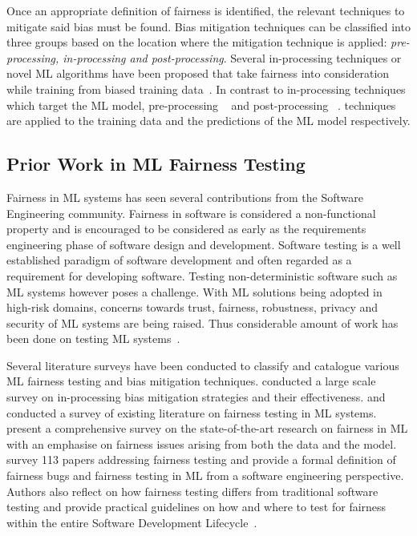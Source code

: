 \documentclass{article}
\begin{document}
Once an appropriate definition of fairness is identified, the relevant
techniques to mitigate said bias must be found. Bias mitigation
techniques can be classified into three groups based on the location
where the mitigation technique is applied: \emph{pre-processing,
in-processing and post-processing}. Several in-processing techniques
or novel ML algorithms have been proposed that take fairness into
consideration while training from biased training
data \cite{zhang2018mitigating,agarwal2018reductions,kearns2018preventing,kearns2019empirical,kamishima2012fairness}.
In contrast to in-processing techniques which target the ML model,
pre-processing
 \cite{feldman2015certifying,zemel2013learning,calmon2017optimized,kamiran2012data}
and post-processing
 \cite{pleiss2017fairness,hardt2016equality,kamiran2012decision}.
techniques are applied to the training data and the predictions of the
ML model respectively.

\subsection{Prior Work in ML Fairness Testing}\label{sec:prior-work}

Fairness in ML systems has seen several contributions from the
Software Engineering community. Fairness in software is considered a
non-functional property and is encouraged to be considered as early as
the requirements engineering phase of software design and development.
Software testing is a well established paradigm of software
development and often regarded as a requirement for developing
software. Testing non-deterministic software such as ML systems
however poses a challenge. With ML solutions being adopted in
high-risk domains, concerns towards trust, fairness, robustness,
privacy and security of ML systems are being raised. Thus considerable
amount of work has been done on testing ML
systems \cite{zhang2020machine}.

Several literature surveys have been conducted to classify and
catalogue various ML fairness testing and bias mitigation techniques.
\citeauthor{wan2021modeling} conducted a large scale survey on
in-processing bias mitigation strategies and their effectiveness.
\citeauthor{chen2022fairness} and \citeauthor{mehrabi2021survey}
conducted a survey of existing literature on fairness testing in ML
systems. \citeauthor{mehrabi2021survey} present a comprehensive survey
on the state-of-the-art research on fairness in ML with an emphasise
on fairness issues arising from both the data and the model.
\citeauthor{chen2022fairness} survey 113 papers addressing fairness
testing and provide a formal definition of fairness bugs and fairness
testing in ML from a software engineering perspective. Authors also reflect on how
fairness testing differs from traditional software testing and provide
practical guidelines on how and where to test for fairness within the
entire Software Development
Lifecycle \cite{wan2021modeling,chen2022fairness,mehrabi2021survey}.
\end{document}

